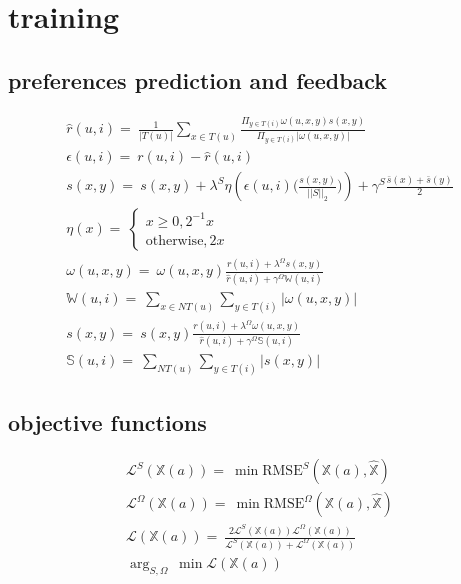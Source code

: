 \section{training}
\subsection{preferences prediction and feedback}
\begin{gather}
    \hat{r}(u,i)=~ \frac{1}{|T(u)|}\sum_{x \in T(u)}\frac{\Pi_{y \in T(i)} \omega(u,x,y)s(x,y)}{\Pi_{y \in T(i)}|\omega(u,x,y)|} \\
    \epsilon(u,i) =~ r(u,i) - \hat{r}(u,i) \\
    s(x,y)=~ s(x,y)+\lambda^{S}
    \eta \left(\epsilon(u,i) \Big(\frac{s(x,y)}{||S||_{2}} \Big) \right) + \gamma^{S} \frac{\bar{s}(x)+\bar{s}(y)}{2} \\
    \eta(x)=~ \begin{cases}
    x \geq 0,  2^{-1}x \\
    \text{otherwise},  2x
    \end{cases} \\
    \omega(u,x,y)=~ \omega(u,x,y)
    \frac{r(u,i)+\lambda^{\Omega} s(x,y)}
    {\hat{r}(u,i)+\gamma^{\Omega}\mathbb{W}(u,i)} \\
    \mathbb{W}(u,i)=~ \sum_{x\in NT(u)}\sum_{y \in T(i)} |\omega(u,x,y)| \\
    s(x,y)=~ s(x,y)\frac
    {r(u,i)+\lambda^{\Omega}\omega(u,x,y)}
    {\hat{r}(u,i) +\gamma^{\Omega}\mathbb{S}(u,i)} \\
    \mathbb{S}(u,i)=~ \sum_{NT(u)}\sum_{y \in T(i)} |s(x,y)|
\end{gather}

\subsection{objective functions}
\begin{gather}
    \mathcal{L}^{S}(\mathbb{X}(a)) =~ \min \text{RMSE}^{S}(\mathbb{X}(a), \hat{\mathbb{X}}) \\
    \mathcal{L}^{\Omega}(\mathbb{X}(a)) =~ \min \text{RMSE}^{\Omega}(\mathbb{X}(a), \hat{\mathbb{X}}) \\
    \mathcal{L}(\mathbb{X}(a)) =~ \frac{2 \mathcal{L}^{S}(\mathbb{X}(a)) \mathcal{L}^{\Omega}(\mathbb{X}(a))}{\mathcal{L}^{S}(\mathbb{X}(a)) + \mathcal{L}^{\Omega}(\mathbb{X}(a))} \\
    \arg_{S, \Omega}~ \min \mathcal{L}(\mathbb{X}(a)) \label{eq:obj_func}
\end{gather}